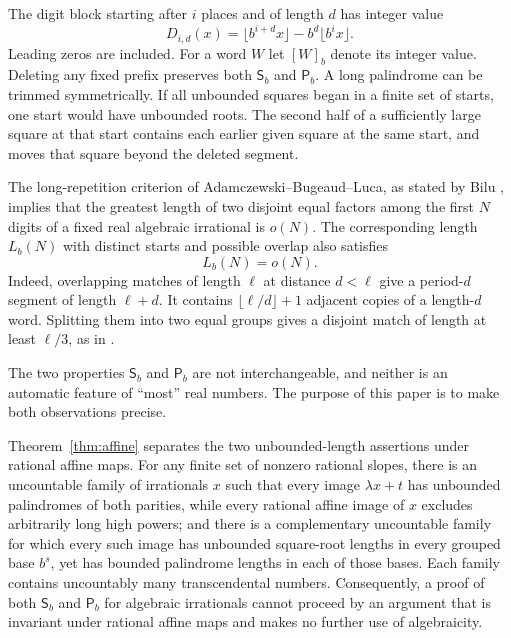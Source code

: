 \documentclass[11pt,reqno,a4paper]{amsart}
\theoremstyle{remark}
\begin{document}
The digit block starting after $i$ places and of length $d$ has integer value
\begin{equation}\label{eq:digitblock}
 D_{i,d}(x)=\lfloor b^{i+d}x\rfloor-b^d\lfloor b^i x\rfloor.
\end{equation}
Leading zeros are included. For a word $W$ let $[W]_b$ denote its integer value. Deleting any fixed prefix preserves both $\mathsf S_b$ and $\mathsf P_b$. A long palindrome can be trimmed symmetrically. If all unbounded squares began in a finite set of starts, one start would have unbounded roots. The second half of a sufficiently large square at that start contains each earlier given square at the same start, and moves that square beyond the deleted segment.

The long-repetition criterion of Adamczewski--Bugeaud--Luca, as stated by Bilu \cite[Theorem~3.3, p.~8]{Bilu}, implies that the greatest length of two disjoint equal factors among the first $N$ digits of a fixed real algebraic irrational is $o(N)$. The corresponding length $L_b(N)$ with distinct starts and possible overlap also satisfies
\begin{equation}\label{eq:known-early}
 L_b(N)=o(N).
\end{equation}
Indeed, overlapping matches of length $\ell$ at distance $d<\ell$ give a period-$d$ segment of length $\ell+d$. It contains $\lfloor\ell/d\rfloor+1$ adjacent copies of a length-$d$ word. Splitting them into two equal groups gives a disjoint match of length at least $\ell/3$, as in \cite[Lemma~3.4]{Bilu}.

The two properties $\mathsf S_b$ and $\mathsf P_b$ are not interchangeable, and neither is an automatic feature of ``most'' real numbers. The purpose of this paper is to make both observations precise.

Theorem~\ref{thm:affine} separates the two unbounded-length assertions under rational affine maps. For any finite set of nonzero rational slopes, there is an uncountable family of irrationals $x$ such that every image $\lambda x+t$ has unbounded palindromes of both parities, while every rational affine image of $x$ excludes arbitrarily long high powers; and there is a complementary uncountable family for which every such image has unbounded square-root lengths in every grouped base $b^s$, yet has bounded palindrome lengths in each of those bases. Each family contains uncountably many transcendental numbers. Consequently, a proof of both $\mathsf S_b$ and $\mathsf P_b$ for algebraic irrationals cannot proceed by an argument that is invariant under rational affine maps and makes no further use of algebraicity.
\end{document}
